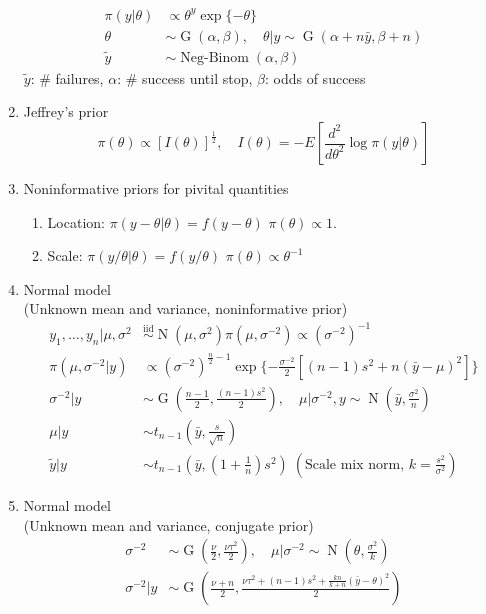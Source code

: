 \documentclass[10pt,landscape]{article}
\newcommand{\NegBinom}{\operatorname{Neg-Binom}}
\newcommand{\N}{\operatorname{N}}
\newcommand{\G}{\operatorname{G}}
\newcommand{\iid}{\overset{\text{iid}}{\sim}}
\begin{document}
\begin{multicols}{3}
\begin{enumerate}
  \begin{align*}
    \pi(y|\theta) & \propto \theta^y \exp\{-\theta\} \\
    \theta & \sim \G(\alpha, \beta), \quad \theta | y \sim \G(\alpha+n\bar{y}, \beta + n) \\
    \tilde{y} & \sim \NegBinom(\alpha, \beta)
  \end{align*}
  $\tilde{y}$: \# failures, $\alpha$: \# success until stop, $\beta$: odds of success
\item Jeffrey's prior
  \[
    \pi(\theta) \propto [I(\theta)]^{\frac{1}{2}}, \quad
    I(\theta) = -E[\frac{d^2}{d\theta^2} \log \pi(y|\theta)]
  \]
\item Noninformative priors for pivital quantities
  \begin{enumerate}
  \item Location: $\pi(y-\theta | \theta) = f(y-\theta)$ \Rightarrow $\pi(\theta) \propto 1$. \\
  \item Scale: $\pi(y/\theta | \theta) = f(y/\theta)$ \Rightarrow $\pi(\theta) \propto \theta^{-1}$
  \end{enumerate}
\item Normal model \\
  (Unknown mean and variance, noninformative prior)
  \begin{align*}
    y_1, \ldots, y_n | \mu, \sigma^2 & \iid \N(\mu, \sigma^2)
    \pi(\mu, \sigma^{-2}) \propto (\sigma^{-2})^{-1} \\
    \pi(\mu, \sigma^{-2}|y) & \propto (\sigma^{-2})^{\frac{n}{2}-1} \exp\{-\frac{\sigma^{-2}}{2}[(n-1)s^2 + n(\bar{y} - \mu)^2]\} \\
    \sigma^{-2}|y & \sim \G(\frac{n-1}{2}, \frac{(n-1)s^2}{2}), \quad \mu | \sigma^{-2}, y \sim \N(\bar{y}, \frac{\sigma^2}{n}) \\
    \mu|y & \sim t_{n-1}(\bar{y}, \frac{s}{\sqrt{n}}) \\
    \tilde{y} | y & \sim t_{n-1}(\bar{y}, (1+\frac{1}{n})s^2) \;(\text{Scale mix norm, $k = \frac{s^2}{\sigma^2}$})
  \end{align*}
\item Normal model \\
  (Unknown mean and variance, conjugate prior)
  \begin{align*}
    \sigma^{-2} & \sim \G(\frac{\nu}{2}, \frac{\nu\tau^2}{2}), \quad \mu | \sigma^{-2} \sim \N(\theta, \frac{\sigma^2}{k}) \\
    \sigma^{-2} | y & \sim \G(\frac{\nu+n}{2}, \frac{\nu\tau^2 + (n-1)s^2+\frac{kn}{k+n}(\bar{y}-\theta)^2}{2}) \\

\end{align*}
\end{enumerate}
\end{multicols}
\end{document}
